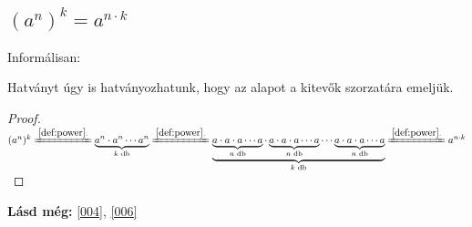 \subsection{\texorpdfstring{$(a^n)^k = a^{n \cdot k}$}{(a**n)**k = a**(n * k)}}
Informálisan:

Hatványt úgy is hatványozhatunk, hogy az alapot a kitevők szorzatára emeljük.

\begin{proof}

$(a^n)^k
 \xlongequal{\ref{def:power}.}
 \underbrace{a^n \cdot a^n \dotsm a^n}_{k \text{ db}} 
 \xlongequal{\ref{def:power}.}
 \underbrace{\underbrace{a \cdot a \cdot a \dotsm a}_{n \text{ db}}
   \cdot \underbrace{a \cdot a \cdot a \dotsm a}_{n \text{ db}} \dotsm
   \underbrace{a \cdot a \cdot a \dotsm a}_{n \text{ db}}}_{k \text{ db}}
 \xlongequal{\ref{def:power}.} a^{n \cdot k}
$
\end{proof}

\textbf{Lásd még:} \ref{004}, \ref{006}
